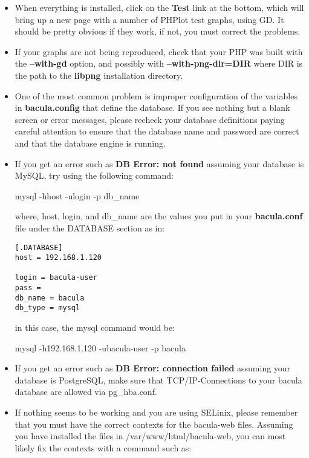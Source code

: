 \begin{itemize}
\begin{itemize}
\item When everything is installed, click on the {\bf Test} link at the
   bottom, which will bring up a new page with a number of PHPlot test graphs,
   using GD. It should be pretty obvious if they work, if not, you must
   correct the problems.

\item If your graphs are not being reproduced, check that your PHP was built
   with the {\bf --with-gd} option, and possibly with {\bf --with-png-dir=DIR}
   where DIR is the path to the {\bf libpng} installation directory.

\item One of the most common problem is improper configuration of the
   variables in {\bf bacula.config} that define the database.  If you see
   nothing but a blank screen or error messages, please recheck your database
   definitions paying careful attention to ensure that the database name and
   password are correct and that the database engine is running.  

\item If you get an error such as {\bf DB Error: not found} assuming your 
   database is MySQL, try using the following command:

   mysql -h\lt{}host\gt{} -u\lt{}login\gt{} -p \lt{}db_name\gt{}

   where, \lt{}host\gt{}, \lt{}login\gt{}, and \lt{}db_name\gt{} are
   the values you put in your {\bf bacula.conf} file under the 
   DATABASE section as in:
\begin{verbatim}
[.DATABASE]
host = 192.168.1.120
 
login = bacula-user
pass =
db_name = bacula
db_type = mysql
\end{verbatim}

   in this case, the mysql command would be:

   mysql -h192.168.1.120 -ubacula-user -p bacula

\item If you get an error such as {\bf DB Error: connection failed} assuming your
   database is PostgreSQL, make sure that TCP/IP-Connections to your
   bacula database are allowed via pg_hba.conf.


\item If nothing seems to be working and you are using SELinix, please
   remember that you must have the correct contexts for the bacula-web
   files. Assuming you have installed the files in
   /var/www/html/bacula-web, you can most likely fix the contexts with 
   a command such as:


\end{itemize}
\end{itemize}
